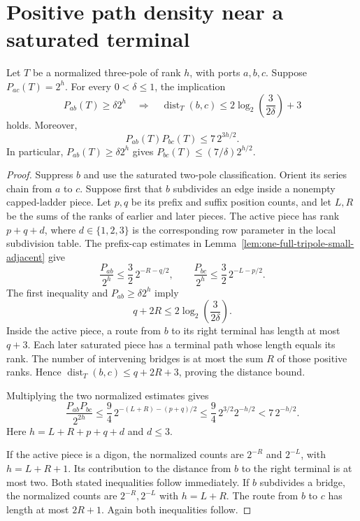 \section{Positive path density near a saturated terminal}
\label{sec:positive-port-localization}

\begin{lemma}
\label{lem:positive-port-clustering}
Let $T$ be a normalized three-pole of rank $h$, with ports $a,b,c$.
Suppose $P_{ac}(T)=2^h$.
For every $0<\delta\le1$, the implication
\[
 P_{ab}(T)\ge\delta2^h
 \quad\Longrightarrow\quad
 \operatorname{dist}_T(b,c)
 \le2\log_2\!\left(\frac3{2\delta}\right)+3
\]
holds.
Moreover,
\begin{equation}\label{eq:one-full-product-tradeoff}
 P_{ab}(T)P_{bc}(T)\le7\,2^{3h/2}.
\end{equation}
In particular, $P_{ab}(T)\ge\delta2^h$ gives
$P_{bc}(T)\le(7/\delta)2^{h/2}$.
\end{lemma}

\begin{proof}
Suppress $b$ and use the saturated two-pole classification.
Orient its series chain from $a$ to $c$.
Suppose first that $b$ subdivides an edge inside a nonempty capped-ladder piece.
Let $p,q$ be its prefix and suffix position counts, and let $L,R$ be the sums of the ranks of earlier and later pieces.
The active piece has rank $p+q+d$, where $d\in\{1,2,3\}$ is the corresponding row parameter in the local subdivision table.
The prefix-cap estimates in Lemma~\ref{lem:one-full-tripole-small-adjacent} give
\[
 \frac{P_{ab}}{2^h}\le\frac32\,2^{-R-q/2},\qquad
 \frac{P_{bc}}{2^h}\le\frac32\,2^{-L-p/2}.
\]
The first inequality and $P_{ab}\ge\delta2^h$ imply
\[
 q+2R\le2\log_2\!\left(\frac3{2\delta}\right).
\]
Inside the active piece, a route from $b$ to its right terminal has length at most $q+3$.
Each later saturated piece has a terminal path whose length equals its rank.
The number of intervening bridges is at most the sum $R$ of those positive ranks.
Hence $\operatorname{dist}_T(b,c)\le q+2R+3$, proving the distance bound.

Multiplying the two normalized estimates gives
\[
 \frac{P_{ab}P_{bc}}{2^{2h}}
 \le\frac94\,2^{-(L+R)-(p+q)/2}
 \le\frac94\,2^{3/2}2^{-h/2}<7\,2^{-h/2}.
\]
Here $h=L+R+p+q+d$ and $d\le3$.

If the active piece is a digon, the normalized counts are $2^{-R}$ and $2^{-L}$, with $h=L+R+1$.
Its contribution to the distance from $b$ to the right terminal is at most two.
Both stated inequalities follow immediately.
If $b$ subdivides a bridge, the normalized counts are $2^{-R},2^{-L}$ with $h=L+R$.
The route from $b$ to $c$ has length at most $2R+1$.
Again both inequalities follow.
\end{proof}

